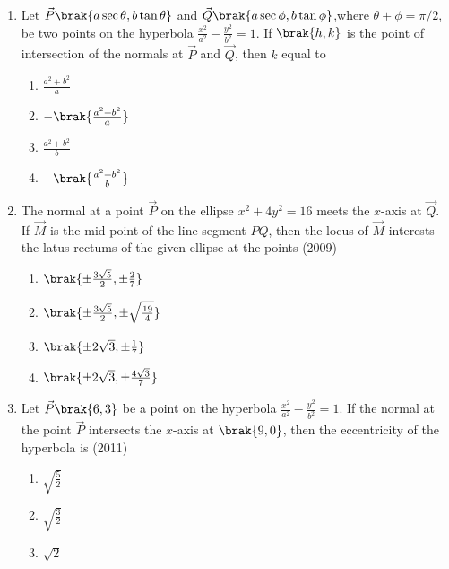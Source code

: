 \begin{enumerate}[label=\thesubsection.\arabic*.,ref=\thesubsection.\theenumi]
\begin{multicols}{4}
\begin{enumerate}
	\item $2$
	\item infinite
	\end{enumerate}
\end{multicols}
\item Let $\vec{P}\brak{a\sec\theta,b\tan\theta}$ and $\vec{Q}\brak{a\sec\phi,b\tan \phi}$,where $\theta+\phi=\pi/2$, be two points on the hyperbola $\frac{x^2}{a^2}-\frac{y^2}{b^2}=1$. If $\brak{h,k}$ is the point of intersection of the normals at $\vec{P}$ and $\vec{Q}$, then $k$ equal to 
      \hfill {}
\begin{multicols}{4}
\begin{enumerate}
    \item $\frac{a^2+b^2}{a}$
    \item $-\brak{\frac{a^2+b^2}{a}}$
    \item $\frac{a^2+b^2}{b}$
    \item $-\brak{\frac{a^2+b^2}{b}}$
\end{enumerate}
\end{multicols}
    \item The normal at a point $\vec{P}$ on the ellipse $x^2 +4y^2=16$ meets the $x$-axis at $\vec{Q}$. If $\vec{M}$ is the mid point of the line segment ${PQ}$, then the locus of $\vec{M}$ interests the latus rectums of the given ellipse at the points
	\hfill (2009)
		\begin{multicols}{4}
\begin{enumerate}
			\item $\brak{\pm\frac{3\sqrt{5}}{2},\pm\frac{2}{7}}$
			\item $\brak{\pm\frac{3\sqrt{5}}{2},\pm\sqrt{\frac{19}{4}}}$
				\columnbreak
			\item $\brak{\pm2\sqrt{3},\pm\frac{1}{7}}$
			\item $\brak{\pm2\sqrt{3},\pm\frac{4\sqrt{3}}{7}}$
		\end{enumerate}
\end{multicols}
%
\item Let $\vec{P}\brak{6,3}$ be a point on the hyperbola $\frac{x^2}{a^2}-\frac{y^2}{b^2}=1$. If the normal at the point $\vec{P}$ intersects the $x$-axis at $\brak{9,0}$, then the eccentricity of the hyperbola is 
	\hfill (2011)
		\begin{multicols}{4}
\begin{enumerate}
			\item$\sqrt{\frac{5}{2}}$
			\item$\sqrt{\frac{3}{2}}$
				\columnbreak
			\item$\sqrt{2}$

\end{enumerate}
\end{multicols}
\end{enumerate}
